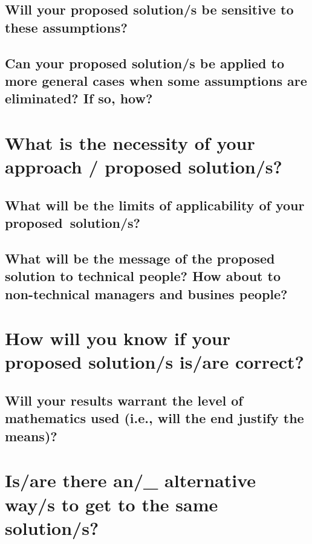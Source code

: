 \subsection*{\thesubsection\quad Will your proposed solution/s be sensitive to these assumptions?}
	
\subsection*{\thesubsection\quad Can your proposed solution/s be applied to more general cases when some assumptions are eliminated? If so, how?}

\section*{\thesection\quad What is the necessity of your approach / proposed solution/s?}

\subsection*{\thesubsection\quad What will be the limits of applicability of your proposed~solution/s?}
				
\subsection*{\thesubsection\quad What will be the message of the proposed solution to technical people?  How about to non-technical managers and busines people?}
	
\section*{\thesection\quad How will you know if your proposed solution/s is/are correct?}
	
\subsection*{\thesubsection\quad Will your results warrant the level of mathematics used (i.e., will the end justify the means)?}
	   
\section*{\thesection\quad Is/are there an/\_ alternative way/s to get to the same solution/s?}


